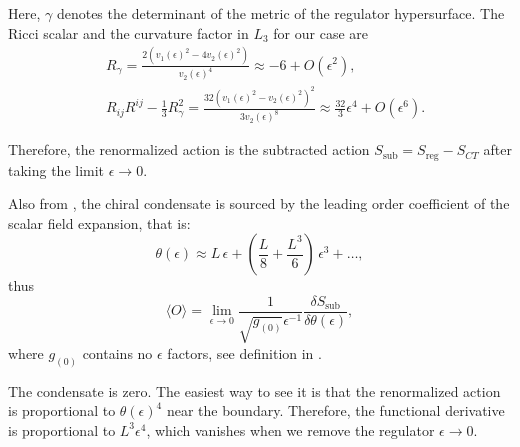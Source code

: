 Here, $\gamma$ denotes the determinant of the metric of the regulator hypersurface. 
The Ricci scalar and the curvature factor in $L_3$ for our case are
\begin{align}
& R_\gamma = \frac{2 \left(v_1(\epsilon)^2-4 v_2(\epsilon)^2\right)}{v_2(\epsilon)^4} \approx -6 + O(\epsilon^2),\\
& R_{i j} R^{i j}-\frac{1}{3} R_{\gamma}^{2} = \frac{32 \left(v_1(\epsilon)^2-v_2(\epsilon)^2\right)^2}{3 v_2(\epsilon)^8} \approx \frac{32}{3}\epsilon^4 + O(\epsilon^6).
\end{align}

Therefore, the renormalized action is the subtracted action $S_\text{sub} = S_\text{reg}-S_{CT}$ after taking the limit $\epsilon \rightarrow 0$.

Also from \cite{Karch:2005ms}, the chiral condensate is sourced by the leading order coefficient of the scalar field expansion, that is:
\begin{equation}
 \theta(\epsilon) \approx L \, \epsilon + \left(\frac{L}{8} +\frac{L^3}{6} \right) \, \epsilon^3 + \ldots,
\end{equation}
thus
\begin{equation} \label{eq:asymptoticSolution}
\langle O \rangle = \lim_{\epsilon \rightarrow 0}\frac{1}{\sqrt{g_{(0)}}\epsilon^{-1}}\frac{\delta S_\text{sub}}{\delta \theta(\epsilon)},
\end{equation}
where $g_{(0)}$ contains no $\epsilon$ factors, see definition in \cite{Karch:2005ms}. 

The condensate is zero. The easiest way to see it is that the renormalized action is proportional to $\theta(\epsilon)^4$ near the boundary. Therefore, the functional derivative is proportional to $L^3 \epsilon^4$, which vanishes when we remove the regulator $\epsilon \rightarrow 0$.



 




